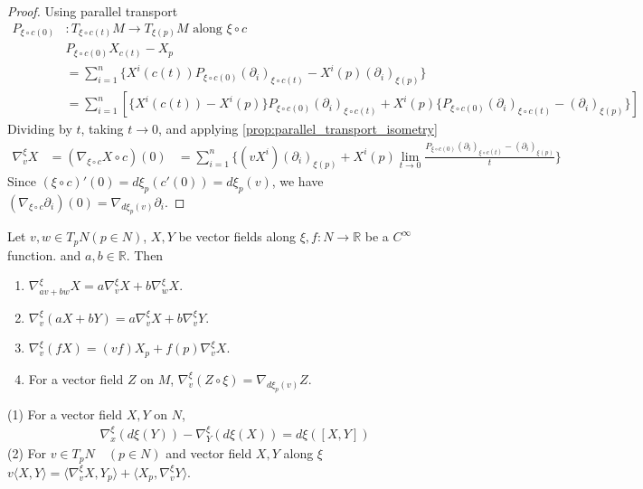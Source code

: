 \begin{proof}
    Using parallel transport
    \[
    \begin{aligned}
        P_{\xi \circ c(0)}& : T_{\xi \circ c(t)}M \to T_{\xi(p)}M \text{ along } \xi \circ c \\
        & P_{\xi \circ c(0)} X_{c(t)} -X_p\\
        &= \sum_{i=1}^n \{X^i (c(t)) P_{\xi \circ c(0) }(\partial_i)_{\xi \circ c(t)} - X^i(p) (\partial_i)_{\xi(p)}\} \\
        &= \sum_{i=1}^n [\{X^i(c(t)) - X^i(p)\}P_{\xi \circ c(0)}(\partial_i)_{\xi \circ c(t)} + X^i(p)\{P_{\xi \circ c(0)}(\partial_i)_{\xi \circ c(t)} - (\partial_i)_{\xi(p)}\}]
    \end{aligned}
    \]
    Dividing by $t$, taking $t \to 0$, and applying \autoref{prop:parallel_transport_isometry}
    \[
    \begin{aligned}
        \nabla_v^{\xi}X &= (\nabla_{\xi \circ c} X \circ c)( 0) &= \sum_{i=1}^n \{(v X^i)(\partial_i)_{\xi(p)} + X^i(p) \lim_{t \to 0} \frac{P_{\xi \circ c(0)}(\partial_i)_{\xi \circ c(t)} - (\partial_i)_{\xi(p)}}{t}\} 
    \end{aligned}
    \]
    Since $(\xi \circ c)'(0) = d \xi_p(c'(0)) = d \xi_p(v)$, we have $(\nabla_{\xi \circ c} \partial_i)(0) = \nabla_{d \xi_p(v)} \partial_i$.
\end{proof}

\begin{proposition}
    Let $v,w \in T_p N (p \in N)$, $X,Y$ be vector fields along $\xi, f:N \to \mathbb{R}$ be a $C^{\infty}$ function. 
    and $a,b \in \mathbb{R}$. Then
    \begin{enumerate}
        \item \label{prop:cov_deriv_linearity_first_arg} $\nabla_{av + bw}^{\xi}X = a \nabla_v^{\xi}X + b \nabla_w^{\xi}X$.
        \item \label{prop:cov_deriv_linearity_second_arg} $\nabla_v^{\xi}(aX + bY) = a \nabla_v^{\xi}X + b \nabla_v^{\xi}Y$.
        \item \label{prop:cov_deriv_leibniz} $\nabla_v^{\xi}(fX) = (vf) X_p + f(p) \nabla_v^{\xi}X$.
        \item \label{prop:cov_deriv_pullback_vector_field} For a vector field $Z$ on $M$, $\nabla_v^{\xi}(Z \circ \xi) = \nabla_{d \xi_p(v)} Z$.
    \end{enumerate}
\end{proposition}

\begin{proposition}
    (1) For a vector field $X,Y$ on $N$,
    \[
    \begin{aligned}
        \nabla_x^{\xi} (d \xi (Y)) - \nabla_Y^{\xi}(d \xi (X)) = d \xi([X,Y])
    \end{aligned}
    \]
    (2) For $v \in T_p N \quad (p \in N)$ and vector field $X,Y$ along $\xi$ 
    $v \langle X, Y \rangle = \langle \nabla_v^{\xi}X, Y_p \rangle + \langle X_p, \nabla_v^{\xi}Y \rangle$. 
\end{proposition}

